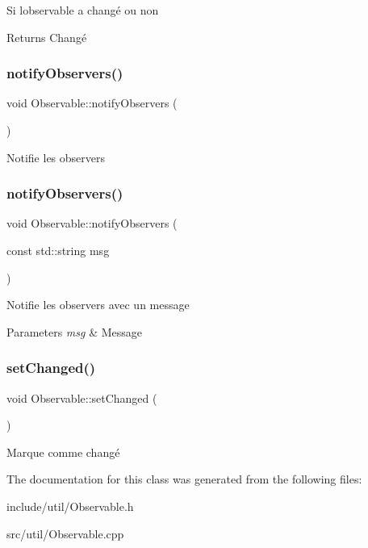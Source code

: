 Si l\textquotesingle{}observable a changé ou non

\begin{DoxyReturn}{Returns}
Changé 
\end{DoxyReturn}
\mbox{\label{classObservable_ad88b0ad8e623c5450ac3857daeb1c330}} 
\subsubsection{\texorpdfstring{notify\+Observers()}{notifyObservers()}\hspace{0.1cm}{\footnotesize\ttfamily [1/2]}}
{\footnotesize\ttfamily void Observable\+::notify\+Observers (\begin{DoxyParamCaption}{ }\end{DoxyParamCaption})}

Notifie les observers \mbox{\label{classObservable_a4d40c0f80343cd4fe27ab195e11e9d71}} 
\subsubsection{\texorpdfstring{notify\+Observers()}{notifyObservers()}\hspace{0.1cm}{\footnotesize\ttfamily [2/2]}}
{\footnotesize\ttfamily void Observable\+::notify\+Observers (\begin{DoxyParamCaption}\item[{const std\+::string}]{msg }\end{DoxyParamCaption})}

Notifie les observers avec un message


\begin{DoxyParams}{Parameters}
{\em msg} & Message \\
\hline
\end{DoxyParams}
\mbox{\label{classObservable_a7041841fb1de932dd6677ae273b3bb9a}} 
\subsubsection{\texorpdfstring{set\+Changed()}{setChanged()}}
{\footnotesize\ttfamily void Observable\+::set\+Changed (\begin{DoxyParamCaption}{ }\end{DoxyParamCaption})\hspace{0.3cm}{\ttfamily [protected]}}

Marque comme changé 

The documentation for this class was generated from the following files\+:\begin{DoxyCompactItemize}
\item 
include/util/Observable.\+h\item 
src/util/Observable.\+cpp\end{DoxyCompactItemize}
